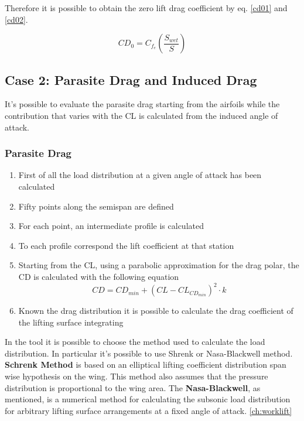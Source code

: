 Therefore it is possible to obtain the zero lift drag coefficient by eq. \ref{cd01} and \ref{cd02}.

\begin{equation}
CD_0 =  C_{f_{e}} \left( \frac{S_{wet}}{S}\right)
\end{equation}


\subsection{Case 2: Parasite Drag and Induced Drag}
It's possible to evaluate the parasite drag starting from the airfoils while the contribution that varies with the CL is calculated from the induced angle of attack.

\subsubsection{Parasite Drag}
\begin{enumerate}
	\item First of all the load distribution at a given angle of attack has been calculated
	\item Fifty points along the semispan are defined
	\item For each point, an intermediate profile is calculated
	\item To each profile correspond the lift coefficient at that station
	\item Starting from the CL, using a parabolic approximation for the drag polar, the CD is calculated with the following equation
	\begin{equation}
	CD = CD_{min} + (CL - CL_{CD_{min}})^2 \cdot k
	\end{equation}
	\item Known the drag distribution it is possible to calculate the drag coefficient of the lifting surface integrating
	\end{enumerate}
	
	In the tool it is possible to choose the method used to calculate the load distribution. In particular it's possible to use Shrenk or Nasa-Blackwell method.\\
{\bfseries Schrenk Method} is based on an elliptical lifting coefficient distribution span wise hypothesis on the wing. This method also assumes that the pressure distribution is proportional to the wing area. 
	The {\bfseries Nasa-Blackwell}, as mentioned, is a numerical method for calculating the subsonic load distribution for arbitrary lifting surface arrangements at a fixed angle of attack. \ref{ch:worklift}


